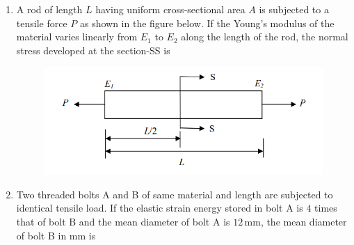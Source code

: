 \documentclass[journal]{IEEEtran}
\begin{document}
\begin{enumerate}[leftmargin=0pt]
\item A rod of length $L$ having uniform cross-sectional area $A$ is subjected to a tensile force $P$ as shown in the figure below. If the Young's modulus of the material varies linearly from $E_1$ to $E_2$ along the length of the rod, the normal stress developed at the section-SS is
\begin{figure}[h]
\centering
\includegraphics[width=0.5\columnwidth]{Figs/image (14).png}
\caption*{}
\label{fig:5}
\end{figure}

\begin{enumerate}
\end{enumerate}

\hfill{}
\item Two threaded bolts A and B of same material and length are subjected to identical tensile load. If the elastic strain energy stored in bolt A is $4$ times that of bolt B and the mean diameter of bolt A is $12\,\text{mm}$, the mean diameter of bolt B in mm is
\begin{enumerate}
\end{enumerate}

\hfill{}


\end{enumerate}
\end{document}
